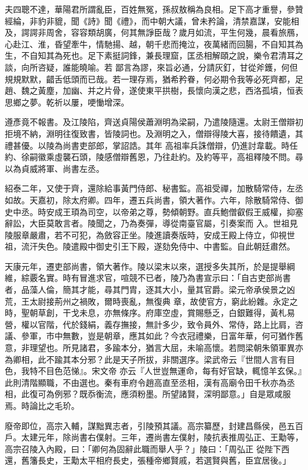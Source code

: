 \begin{pinyinscope}
 夫四聰不達，華陽君所謂亂臣，百姓無冤，孫叔敖稱為良相。足下高才重譽，參贊經綸，非豹非貔，聞《詩》聞《禮》，而中朝大議，曾未矜論，清禁嘉謀，安能相及，諤諤非周舍，容容類胡廣，何其無諍臣哉？歲月如流，平生何幾，晨看旅鴈，心赴江、淮，昏望牽牛，情馳揚、越，朝千悲而掩泣，夜萬緒而回腸，不自知其為生，不自知其為死也。足下素挺詞鋒，兼長理窟，匡丞相解頤之說，樂令君清耳之談，向所咨疑，誰能曉喻。若
 鄙言為謬，來旨必通，分請灰釘，甘從斧鑊，何但規規默默，齰舌低頭而已哉。若一理存焉，猶希矜眷，何必期令我等必死齊都，足趙、魏之黃塵，加幽、并之片骨，遂使東平拱樹，長懷向漢之悲，西洛孤墳，恒表思鄉之夢。乾祈以屢，哽慟增深。



 遵彥竟不報書。及江陵陷，齊送貞陽侯蕭淵明為梁嗣，乃遣陵隨還。太尉王僧辯初拒境不納，淵明往復致書，皆陵詞也。及淵明之入，僧辯得陵大喜，接待饋遺，其禮甚優。以陵為尚書吏部郎，掌詔誥。其年
 高祖率兵誅僧辯，仍進討韋載。時任約、徐嗣徽乘虛襲石頭，陵感僧辯舊恩，乃往赴約。及約等平，高祖釋陵不問。尋以為貞威將軍、尚書左丞。



 紹泰二年，又使于齊，還除給事黃門侍郎、秘書監。高祖受禪，加散騎常侍，左丞如故。天嘉初，除太府卿。四年，遷五兵尚書，領大著作。六年，除散騎常侍、御史中丞。時安成王頊為司空，以帝弟之尊，勢傾朝野。直兵鮑僧叡假王威權，抑塞辭訟，大臣莫敢言者。陵聞之，乃為奏彈，導從南臺官屬，引奏案而
 入。世祖見陵服章嚴肅，若不可犯，為斂容正坐。陵進讀奏版時，安成王殿上侍立，仰視世祖，流汗失色。陵遣殿中御史引王下殿，遂劾免侍中、中書監。自此朝廷肅然。



 天康元年，遷吏部尚書，領大著作。陵以梁末以來，選授多失其所，於是提舉綱維，綜覈名實。時有冒進求官，喧競不已者，陵乃為書宣示曰：「自古吏部尚書者，品藻人倫，簡其才能，尋其門胄，逐其大小，量其官爵。梁元帝承侯景之凶荒，王太尉接荊州之禍敗，爾時喪亂，無復典
 章，故使官方，窮此紛雜。永定之時，聖朝草創，干戈未息，亦無條序。府庫空虛，賞賜懸乏，白銀難得，黃札易營，權以官階，代於錢絹，義存撫接，無計多少，致令員外、常侍，路上比肩，咨議、參軍，市中無數，豈是朝章，應其如此？今衣冠禮樂，日富年華，何可猶作舊意，非理望也。所見諸君，多踰本分，猶言大屈，未喻高懷。若問梁朝朱領軍異亦為卿相，此不踰其本分邪？此是天子所拔，非關選序。梁武帝云『世間人言有目色，我特不目色范悌』。宋文帝
 亦云『人世豈無運命，每有好官缺，輒憶羊玄保。』此則清階顯職，不由選也。秦有車府令趙高直至丞相，漢有高廟令田千秋亦為丞相，此復可為例邪？既忝衡流，應須粉墨。所望諸賢，深明鄙意。」自是眾咸服焉。時論比之毛玠。



 廢帝即位，高宗入輔，謀黜異志者，引陵預其議。高宗纂歷，封建昌縣侯，邑五百戶。太建元年，除尚書右僕射。三年，遷尚書左僕射，陵抗表推周弘正、王勱等，高宗召陵入內殿，曰：「卿何為固辭此職而舉人乎？」陵曰：「周弘正
 從陛下西還，舊籓長史，王勱太平相府長史，張種帝鄉賢戚，若選賢與舊，臣宜居後。」




\end{pinyinscope}

